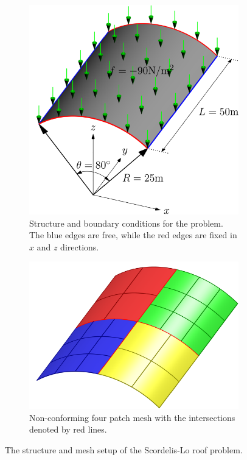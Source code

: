 \documentclass[preprint,12pt]{elsarticle}
\theoremstyle{remark}
\begin{document}
\begin{figure}[!hbt]
    \centering
    \captionsetup[subfigure]{font = footnotesize}
    \begin{subfigure}[b]{.48\textwidth}
        \centering
        \includegraphics[width = \textwidth]{roof_config}
        \caption{Structure and boundary conditions for the problem. The blue edges are free, while the red edges are fixed in $x$ and $z$ directions.}\label{fig:scordelis-lo}
    \end{subfigure}
    \begin{subfigure}[b]{.48\textwidth}
        \centering
        \includegraphics[width = \textwidth]{roof_decompose}
        \vspace{.5cm}
        \caption{Non-conforming four patch mesh with the intersections denoted by red lines.}\label{fig:scordelis-lo-decompose}
    \end{subfigure}
	\caption{The structure and mesh setup of the Scordelis-Lo roof problem.}
\end{figure}
\end{document}
